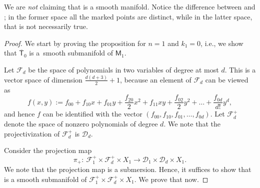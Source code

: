 \documentclass[11pt]{article}
\numberwithin{equation}{section}
\begin{document}
\begin{rem}
 We are \emph{not} claiming that
is a smooth manifold. Notice the difference between
and ; in the former space
all the marked points are distinct, while in the latter space, that is not necessarily true.
\end{rem}

\begin{proof}
We start by proving the proposition for $n = 1$
and $k_1 = 0$, i.e., we show that $\overline{\mathsf{T}}_0$ is a~smooth
submanifold of $\mathsf{M}_1$.

Let $\mathcal{F}_d$ be the space of
polynomials in two variables of degree at most $d$.
This is a vector space of dimension $\frac{d(d+3)}{2} + 1$, because
an element of $\mathcal{F}_d$ can be viewed as
\[
 f(x, y) := f_{00} + f_{10}x + f_{01} y + \frac{f_{20}}{2} x^2 + f_{11} xy + \frac{f_{02}}{2} y^2 +
\dots + \frac{f_{0d}}{d!} y^d,
\]
and hence $f$ can be identified with the vector
$(f_{00}, f_{10}, f_{01},\dots, f_{0d})$.
Let $\mathcal{F}_d^{+}$ denote the space of nonzero polynomials of degree $d$.
We note that the projectivization of $\mathcal{F}_d^{+}$ is $\mathcal{D}_d$.

Consider the projection map
\[ \pi_{+}\colon\ \mathcal{F}_1^{+} \times \mathcal{F}_d^{+} \times X_1 \longrightarrow
\mathcal{D}_1 \times \mathcal{D}_d \times X_1.  \]
We note that the projection map is a submersion. Hence, it suffices to show that
 is a smooth submanifold of
$\mathcal{F}_1^{+} \times \mathcal{F}_d^{+} \times X_1$. We prove that now.


\end{proof}
\end{document}
